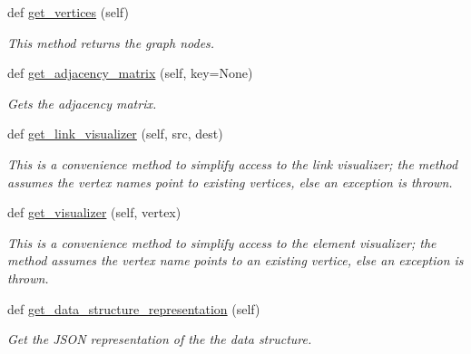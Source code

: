 \begin{DoxyCompactItemize}
def \mbox{\hyperlink{class_bridges_1_1_graph_adj_matrix_1_1_graph_adj_matrix_a0bebc872619b97d2d1a1083511bfd62b}{get\+\_\+vertices}} (self)
\begin{DoxyCompactList}\small\item\em This method returns the graph nodes. \end{DoxyCompactList}\item 
def \mbox{\hyperlink{class_bridges_1_1_graph_adj_matrix_1_1_graph_adj_matrix_aa3d184df6b73dd3692335b188addbbb9}{get\+\_\+adjacency\+\_\+matrix}} (self, key=None)
\begin{DoxyCompactList}\small\item\em Gets the adjacency matrix. \end{DoxyCompactList}\item 
def \mbox{\hyperlink{class_bridges_1_1_graph_adj_matrix_1_1_graph_adj_matrix_acb341596f544ead8a39d00ec778b4a1b}{get\+\_\+link\+\_\+visualizer}} (self, src, dest)
\begin{DoxyCompactList}\small\item\em This is a convenience method to simplify access to the link visualizer; the method assumes the vertex names point to existing vertices, else an exception is thrown. \end{DoxyCompactList}\item 
def \mbox{\hyperlink{class_bridges_1_1_graph_adj_matrix_1_1_graph_adj_matrix_a2ac95314c1f3ac926d43c772e533c975}{get\+\_\+visualizer}} (self, vertex)
\begin{DoxyCompactList}\small\item\em This is a convenience method to simplify access to the element visualizer; the method assumes the vertex name points to an existing vertice, else an exception is thrown. \end{DoxyCompactList}\item 
def \mbox{\hyperlink{class_bridges_1_1_graph_adj_matrix_1_1_graph_adj_matrix_aa1767d3540f08d77d21a9f795dd27df1}{get\+\_\+data\+\_\+structure\+\_\+representation}} (self)
\begin{DoxyCompactList}\small\item\em Get the J\+S\+ON representation of the the data structure. \end{DoxyCompactList}\end{DoxyCompactItemize}
